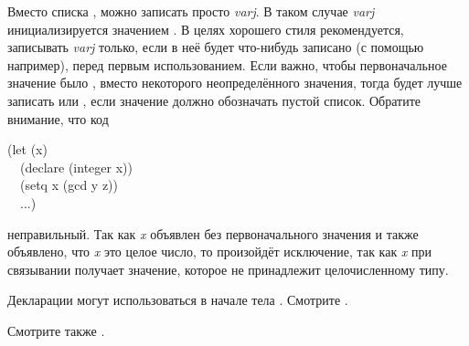 \begin{defspec}
Вместо списка , можно записать просто
\emph{varj}. В таком случае \emph{varj} инициализируется значением {\false}.
В целях хорошего стиля рекомендуется, записывать \emph{varj} только, если в неё
будет что-нибудь записано (с помощью  например), перед первым
использованием. 
Если важно, чтобы первоначальное значение было {\false}, вместо некоторого
неопределённого значения,
тогда будет лучше записать  или , если значение должно обозначать пустой список. Обратите
внимание, что код
\begin{lisp}
(let (x) \\
~~(declare (integer x)) \\
~~(setq x (gcd y z)) \\
~~...)
\end{lisp}
неправильный. Так как \emph{x} объявлен без первоначального значения и также
объявлено, что \emph{x} это целое число, то произойдёт исключение, так как
\emph{x} при связывании получает {\nil} значение, которое не принадлежит
целочисленному типу.

Декларации могут использоваться в начале тела . Смотрите .

Смотрите также .
\end{defspec}

